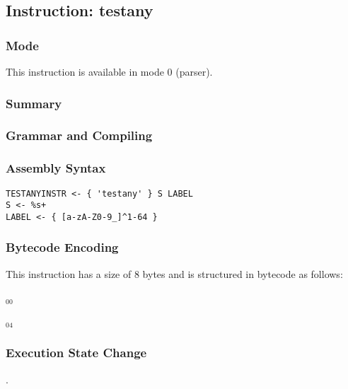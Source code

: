 \subsection{Instruction: testany}

\subsubsection{Mode}
This instruction is available in mode 0 (parser).
\subsubsection{Summary}


\subsubsection{Grammar and Compiling}


\subsubsection{Assembly Syntax}

\begin{myquote}
\begin{verbatim}
TESTANYINSTR <- { 'testany' } S LABEL
S <- %s+
LABEL <- { [a-zA-Z0-9_]^1-64 }
\end{verbatim}
\end{myquote}

\subsubsection{Bytecode Encoding}

This instruction has a size of 8 bytes and is structured in bytecode as follows:

$_{00}$\ 



$_{04}$\ 

\subsubsection{Execution State Change}

.


